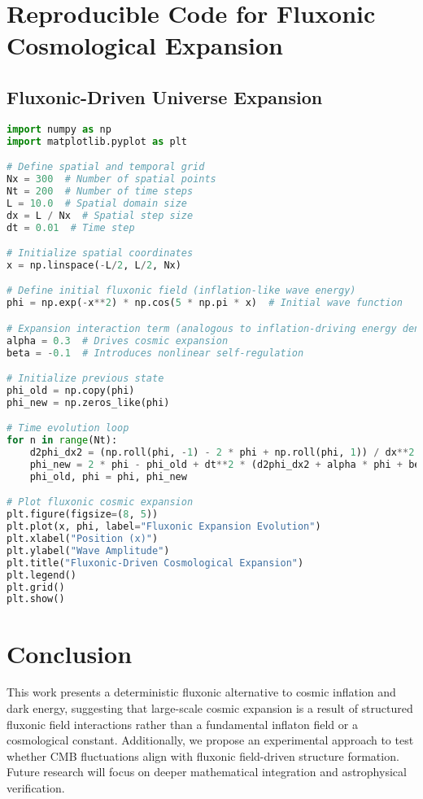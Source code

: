\documentclass{article}
\begin{document}
\section{Reproducible Code for Fluxonic Cosmological Expansion}
\subsection{Fluxonic-Driven Universe Expansion}
\begin{lstlisting}[language=Python]
import numpy as np
import matplotlib.pyplot as plt

# Define spatial and temporal grid
Nx = 300  # Number of spatial points
Nt = 200  # Number of time steps
L = 10.0  # Spatial domain size
dx = L / Nx  # Spatial step size
dt = 0.01  # Time step

# Initialize spatial coordinates
x = np.linspace(-L/2, L/2, Nx)

# Define initial fluxonic field (inflation-like wave energy)
phi = np.exp(-x**2) * np.cos(5 * np.pi * x)  # Initial wave function

# Expansion interaction term (analogous to inflation-driving energy density)
alpha = 0.3  # Drives cosmic expansion
beta = -0.1  # Introduces nonlinear self-regulation

# Initialize previous state
phi_old = np.copy(phi)
phi_new = np.zeros_like(phi)

# Time evolution loop
for n in range(Nt):
    d2phi_dx2 = (np.roll(phi, -1) - 2 * phi + np.roll(phi, 1)) / dx**2
    phi_new = 2 * phi - phi_old + dt**2 * (d2phi_dx2 + alpha * phi + beta * phi**3)
    phi_old, phi = phi, phi_new

# Plot fluxonic cosmic expansion
plt.figure(figsize=(8, 5))
plt.plot(x, phi, label="Fluxonic Expansion Evolution")
plt.xlabel("Position (x)")
plt.ylabel("Wave Amplitude")
plt.title("Fluxonic-Driven Cosmological Expansion")
plt.legend()
plt.grid()
plt.show()
\end{lstlisting}

\section{Conclusion}
This work presents a deterministic fluxonic alternative to cosmic inflation and dark energy, suggesting that large-scale cosmic expansion is a result of structured fluxonic field interactions rather than a fundamental inflaton field or a cosmological constant. Additionally, we propose an experimental approach to test whether CMB fluctuations align with fluxonic field-driven structure formation. Future research will focus on deeper mathematical integration and astrophysical verification.
\end{document}
